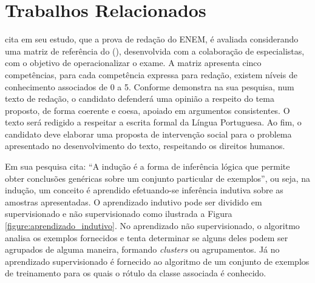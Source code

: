 \section{Trabalhos Relacionados}
\label{section:trabalhos_relacionados}

 cita em seu estudo, que a prova de redação do 
ENEM, é avaliada considerando uma matriz de referência do 
\citeauthor{edital_enem:2016} (\citeyear{edital_enem:2016}), desenvolvida com a 
colaboração de especialistas, com o objetivo de operacionalizar o exame. A 
matriz apresenta cinco competências, para cada competência expressa para 
redação, existem níveis de conhecimento associados de 0 a 5. Conforme 
 demonstra na sua pesquisa, num texto de redação, o 
candidato defenderá uma opinião a respeito do tema proposto, de forma coerente 
e coesa, apoiado em argumentos consistentes. O texto será redigido a respeitar 
a escrita formal da Língua Portuguesa. Ao fim, o candidato deve elaborar uma 
proposta de intervenção social para o problema apresentado no desenvolvimento 
do texto, respeitando os direitos humanos.

Em sua pesquisa  cita: ``A indução é a 
forma de inferência lógica que permite obter conclusões genéricas sobre um 
conjunto particular de exemplos'', ou seja, na indução, um conceito é aprendido 
efetuando-se inferência indutiva sobre as amostras apresentadas. O aprendizado 
indutivo pode ser dividido em supervisionado e não supervisionado como 
ilustrada a Figura \ref{figure:aprendizado_indutivo}. No aprendizado não 
supervisionado, o algoritmo analisa os exemplos fornecidos e tenta determinar 
se alguns deles podem ser agrupados de alguma maneira, formando 
\textit{clusters} ou agrupamentos. Já no aprendizado supervisionado é fornecido 
ao algoritmo de um conjunto de exemplos de treinamento para os quais o rótulo 
da classe associada é conhecido.

